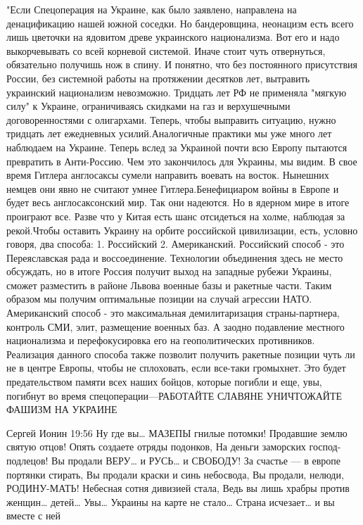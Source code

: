 "Если Спецоперация на Украине, как было заявлено,
направлена на денацификацию нашей южной соседки. Но бандеровщина,
неонацизм есть всего лишь цветочки на ядовитом древе украинского
национализма. Вот его и надо выкорчевывать со всей корневой системой.
Иначе стоит чуть отвернуться, обязательно получишь нож в спину.
И
понятно, что без постоянного присутствия России, без системной работы
на протяжении десятков лет, вытравить украинский национализм невозможно.
Тридцать
лет РФ не применяла "мягкую силу" к Украине, ограничиваясь скидками на
газ и верхушечными договоренностями с олигархами. Теперь, чтобы
выправить ситуацию, нужно тридцать лет ежедневных усилий.Аналогичные
практики мы уже много лет наблюдаем на Украине. Теперь вслед за
Украиной почти всю Европу пытаются превратить в Анти-Россию. Чем это
закончилось для Украины, мы видим. В свое время Гитлера англосаксы
сумели направить воевать на восток. Нынешних немцев они явно не считают
умнее Гитлера.Бенефициаром войны в Европе и будет весь
англосаксонский мир. Так они надеются. Но в ядерном мире в итоге
проиграют все. Разве что у Китая есть шанс отсидеться на холме, наблюдая
за рекой.Чтобы оставить Украину на орбите российской цивилизации, есть, условно говоря, два способа:
1. Российский
2. Американский.
Российский
способ - это Переяславская рада и воссоединение. Технологии объединения
здесь не место обсуждать, но в итоге Россия получит выход на западные
рубежи Украины, сможет разместить в районе Львова военные базы и
ракетные части. Таким образом мы получим оптимальные позиции на случай
агрессии НАТО.
Американский способ - это максимальная
демилитаризация страны-партнера, контроль СМИ, элит, размещение военных
баз. А заодно подавление местного национализма и перефокусировка его на
геополитических противников. Реализация данного способа также позволит
получить ракетные позиции чуть ли не в центре Европы, чтобы не
сплоховать, если все-таки громыхнет.
Это
будет предательством памяти всех наших бойцов, которые погибли и еще,
увы, погибнут во время спецоперации---РАБОТАЙТЕ СЛАВЯНЕ УНИЧТОЖАЙТЕ
ФАШИЗМ НА УКРАИНЕ

Сергей Ионин
19:56
Ну где вы… МАЗЕПЫ гнилые потомки! Продавшие землю святую отцов!
Опять создаете отряды подонков,
На деньги заморских господ-подлецов!
Вы продали ВЕРУ… и РУСЬ… и СВОБОДУ!
За счастье — в европе портянки стирать,
Вы продали краски и синь небосвода,
Вы продали, нелюди, РОДИНУ-МАТЬ!
Небесная сотня дивизией стала,
Ведь вы лишь храбры против женщин… детей…
Увы… Украины на карте не стало…
Страна исчезает… и вы вместе с ней

